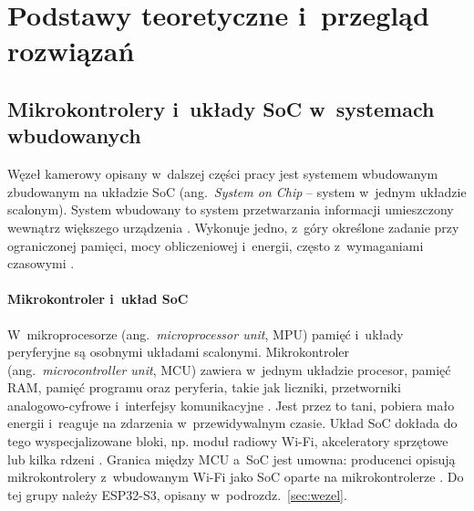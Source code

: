 \chapter{Podstawy teoretyczne i~przegląd rozwiązań}
\label{ch:teoria}

\section{Mikrokontrolery i~układy SoC w~systemach wbudowanych}
\label{sec:mcu-soc}

Węzeł kamerowy opisany w~dalszej części pracy jest systemem wbudowanym
zbudowanym na układzie SoC (ang.~\textit{System on Chip} -- system w~jednym
układzie scalonym). System wbudowany to system przetwarzania informacji
umieszczony wewnątrz większego urządzenia \cite{marwedel_2021}. Wykonuje
jedno, z~góry określone zadanie przy ograniczonej pamięci, mocy obliczeniowej
i~energii, często z~wymaganiami czasowymi \cite{marwedel_2021}.

\subsubsection*{Mikrokontroler i~układ SoC}

W~mikroprocesorze (ang.~\textit{microprocessor unit}, MPU) pamięć i~układy
peryferyjne są osobnymi układami scalonymi. Mikrokontroler
(ang.~\textit{microcontroller unit}, MCU) zawiera w~jednym układzie procesor,
pamięć RAM, pamięć programu oraz peryferia, takie jak liczniki, przetworniki
analogowo-cyfrowe i~interfejsy komunikacyjne \cite{wolf_2017}.
Jest przez to tani, pobiera mało energii i~reaguje na zdarzenia
w~przewidywalnym czasie. Układ SoC dokłada do tego wyspecjalizowane bloki, np.
moduł radiowy Wi-Fi, akceleratory sprzętowe lub kilka rdzeni
\cite{marwedel_2021}. Granica między MCU a~SoC jest umowna:
producenci opisują mikrokontrolery z~wbudowanym Wi-Fi jako SoC oparte na
mikrokontrolerze \cite{espressif_esp32s3_ds}. Do tej grupy należy ESP32-S3,
opisany w~podrozdz.~\ref{sec:wezel}.

